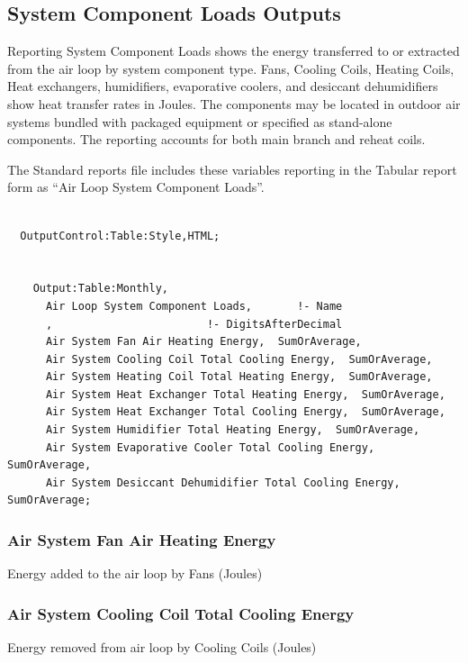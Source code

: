 \subsection{System Component Loads Outputs}\label{system-component-loads-outputs}

Reporting System Component Loads shows the energy transferred to or extracted from the air loop by system component type. Fans, Cooling Coils, Heating Coils, Heat exchangers, humidifiers, evaporative coolers, and desiccant dehumidifiers show heat transfer rates in Joules. The components may be located in outdoor air systems bundled with packaged equipment or specified as stand-alone components. The reporting accounts for both main branch and reheat coils.

The Standard reports file includes these variables reporting in the Tabular report form as ``Air Loop System Component Loads''.

\begin{lstlisting}

  OutputControl:Table:Style,HTML;


    Output:Table:Monthly,
      Air Loop System Component Loads,       !- Name
      ,                        !- DigitsAfterDecimal
      Air System Fan Air Heating Energy,  SumOrAverage,
      Air System Cooling Coil Total Cooling Energy,  SumOrAverage,
      Air System Heating Coil Total Heating Energy,  SumOrAverage,
      Air System Heat Exchanger Total Heating Energy,  SumOrAverage,
      Air System Heat Exchanger Total Cooling Energy,  SumOrAverage,
      Air System Humidifier Total Heating Energy,  SumOrAverage,
      Air System Evaporative Cooler Total Cooling Energy,  SumOrAverage,
      Air System Desiccant Dehumidifier Total Cooling Energy,  SumOrAverage;
\end{lstlisting}

\subsubsection{Air System Fan Air Heating Energy}\label{air-system-fan-air-heating-energy}

Energy added to the air loop by Fans (Joules)

\subsubsection{Air System Cooling Coil Total Cooling Energy}\label{air-system-cooling-coil-total-cooling-energy}

Energy removed from air loop by Cooling Coils (Joules)

